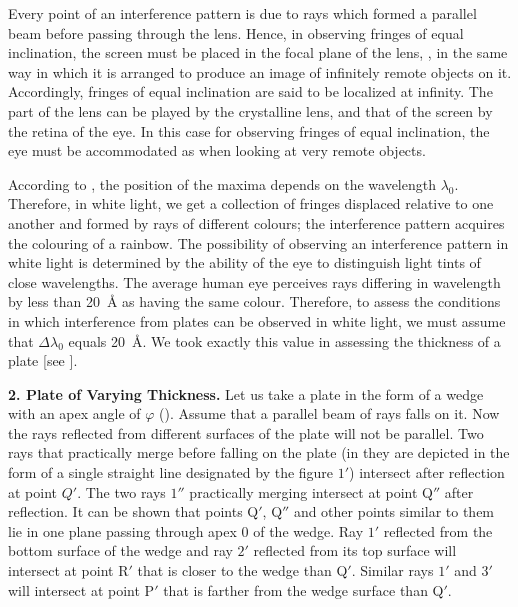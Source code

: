 Every point of an interference pattern is due to rays which formed a parallel beam before passing through the lens.
Hence, in observing fringes of equal inclination, the screen must be placed in the focal plane of the lens, \ie, in the same way in which it is arranged to produce an image of infinitely remote objects on it.
Accordingly, fringes of equal inclination are said to be localized at infinity.
The part of the lens can be played by the crystalline lens, and that of the screen by the retina of the eye.
In this case for observing fringes of equal inclination, the eye must be accommodated as when looking at very remote objects.

According to , the position of the maxima depends on the wavelength $\lambda_0$.
Therefore, in white light, we get a collection of
fringes displaced relative to one another and formed by rays of different colours; the interference pattern acquires the colouring of a rainbow.
The possibility of observing an interference pattern in white light is determined by the ability of the eye to distinguish light tints of close wavelengths.
The average human eye perceives rays differing in wavelength by less than \SI{20}{\angstrom} as having the same colour.
Therefore, to assess the conditions in which interference from plates can be observed in white light, we must assume that $\Delta{\lambda_0}$ equals \SI{20}{\angstrom}.
We took exactly this value in assessing the thickness of a plate [see ].

\textbf{2. Plate of Varying Thickness.}
Let us take a plate in the form of a wedge with an apex angle of $\varphi$ ().
Assume that a parallel beam of rays falls on it.
Now the rays reflected from different surfaces of the plate will not be parallel.
Two rays that practically merge before falling on the plate (in  they are depicted in the form of a single straight line designated by the figure $1'$) intersect after reflection at point $Q'$.
The two rays $1''$ practically merging intersect
at point Q$''$ after reflection.
It can be shown that points Q$'$, Q$''$ and other points similar to them lie in one plane passing through apex $0$ of the wedge.
Ray $1'$ reflected from the bottom surface of the wedge and ray $2'$ reflected from its top surface will intersect at point R$'$ that is closer to the wedge than Q$'$.
Similar rays $1'$ and $3'$ will intersect at point P$'$ that is farther from the wedge surface than Q$'$.

